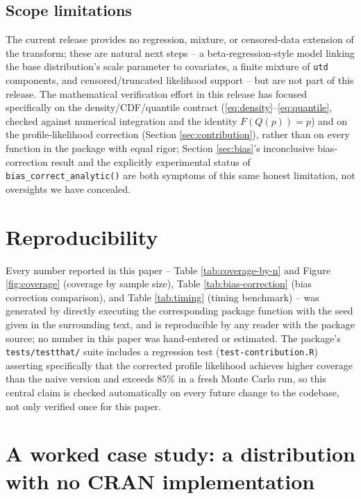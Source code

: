 \subsection{Scope limitations}

The current release provides no regression, mixture, or censored-data
extension of the transform; these are natural next steps -- a
beta-regression-style model linking the base distribution's scale
parameter to covariates, a finite mixture of \texttt{utd} components,
and censored/truncated likelihood support -- but are not part of this
release. The mathematical verification effort in this release has
focused specifically on the density/CDF/quantile contract
(\eqref{eq:density}--\eqref{eq:quantile}, checked against numerical
integration and the identity $F(Q(p))=p$) and on the profile-likelihood
correction (Section \ref{sec:contribution}), rather than on every
function in the package with equal rigor; Section \ref{sec:bias}'s
inconclusive bias-correction result and the explicitly experimental
status of \texttt{bias\_correct\_analytic()} are both symptoms of this
same honest limitation, not oversights we have concealed.

\section{Reproducibility}
\label{sec:reproducibility}

Every number reported in this paper -- Table \ref{tab:coverage-by-n} and
Figure \ref{fig:coverage} (coverage by sample size), Table
\ref{tab:bias-correction} (bias correction comparison), and Table
\ref{tab:timing} (timing benchmark) -- was generated by directly
executing the corresponding package function with the seed given in the
surrounding text, and is reproducible by any reader with the package
source; no number in this paper was hand-entered or estimated. The
package's \texttt{tests/testthat/} suite includes a regression test
(\texttt{test-contribution.R}) asserting specifically that the corrected
profile likelihood achieves higher coverage than the naive version and
exceeds 85\% in a fresh Monte Carlo run, so this central claim is
checked automatically on every future change to the codebase, not only
verified once for this paper.

\section{A worked case study: a distribution with no CRAN implementation}
\label{sec:casestudy}

